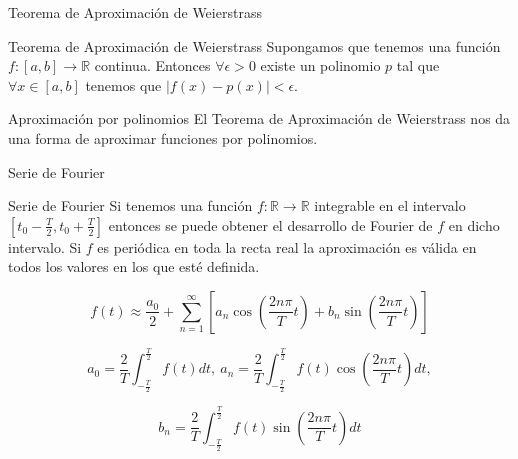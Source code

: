 \documentclass[10pt]{beamer}
\begin{document}
\begin{frame}[fragile]{Teorema de Aproximación de Weierstrass}
\vspace{10px}
\pause
{}

\begin{block}{Teorema de Aproximación de Weierstrass}
	Supongamos que tenemos una función $f:[a,b]\rightarrow \mathbb{R}$ continua. Entonces $\forall \epsilon > 0$ existe un polinomio $p$ tal que $\forall x \in [a,b]$ tenemos que $|f(x)-p(x)|<\epsilon$.
\end{block}

\pause

\begin{alertblock}{Aproximación por polinomios}
	El Teorema de Aproximación de Weierstrass nos da una forma de aproximar funciones por polinomios.
\end{alertblock}

\end{frame}

\begin{frame}[fragile]{Serie de Fourier}
\vspace{10px}
\pause
{}

\begin{block}{Serie de Fourier}
	Si tenemos una función $f:\mathbb{R} \rightarrow \mathbb{R}$ integrable en el intervalo $[t_0 - \frac{T}{2}, t_0 + \frac{T}{2}]$ entonces se puede obtener el desarrollo de Fourier de $f$ en dicho intervalo. Si $f$ es periódica en toda la recta real la aproximación es válida en todos los valores en los que esté definida.
	
	$$f(t) \approx \frac{a_0}{2} + \sum_{n=1}^{\infty}\left[ a_n \cos (\frac{2n\pi}{T}t) + b_n \sin (\frac{2n\pi}{T}t) \right]$$
	
	$$a_0 = \frac{2}{T}\int_{-\frac{T}{2}}^{\frac{T}{2}}f(t)dt, \ a_n = \frac{2}{T}\int_{-\frac{T}{2}}^{\frac{T}{2}} f(t) \cos (\frac{2n\pi}{T}t) dt,$$
	
	$$b_n = \frac{2}{T} \int_{-\frac{T}{2}}^{\frac{T}{2}} f(t) \sin (\frac{2n\pi}{T}t) dt$$
\end{block}

\end{frame}
\end{document}
